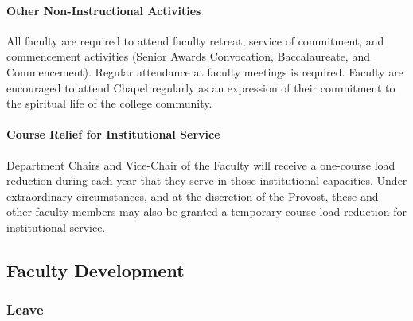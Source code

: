 			\paragraph{Other Non-Instructional Activities}
				All faculty are required to attend faculty retreat, service of commitment, and commencement activities (Senior Awards Convocation, Baccalaureate, and Commencement).  Regular attendance at faculty meetings is required.  Faculty are encouraged to attend Chapel regularly as an expression of their commitment to the spiritual life of the college community.
			\paragraph{Course Relief for Institutional Service}
				Department Chairs and Vice-Chair of the Faculty will receive a one-course load reduction during each year that they serve in those institutional capacities.  Under extraordinary circumstances, and at the discretion of the Provost, these and other faculty members may also be granted a temporary course-load reduction for institutional service.
	\subsection{Faculty Development}

		\subsubsection{Leave}
